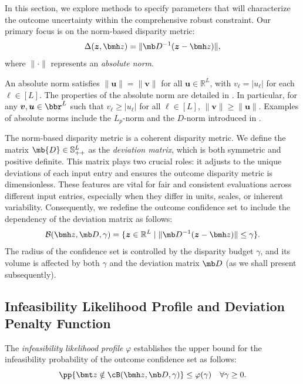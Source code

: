 \documentclass[mnsc, nonblindrev]{informswp}
\newcommand{\1}[1]{\mathds{1}{\left(#1\right)}}
\begin{document}
In this section, we explore methods to specify parameters that will characterize the outcome uncertainty within the comprehensive robust constraint. Our primary focus is on the norm-based disparity metric:
$$
\Delta(\bm z,\bmh z) = \| \mb D^{-1} (\bm z - \bmh z) \|,
$$
where $\|\cdot\|$ represents an {\em absolute norm}. 

\begin{definition}
\textnormal{
An absolute norm satisfies $\|\bm u\| = \| \bm v\|$ for all $\bm u \in \mathbb{R}^L$, with $v_\ell = |u_\ell|$ for each $\ell \in [L]$. The properties of the absolute norm are detailed in \cite{bertsimas2006tractable}. In particular, for any $\bm v, \bm u \in \bbr^L$ such that $v_\ell\geq |u_\ell|$ for all $\ell \in [L]$, $\|\bm v\|\geq \|\bm u\|$. Examples of absolute norms include the $L_p$-norm and the $D$-norm introduced in \cite{bertsimas2004robust}.
}
\end{definition}

The norm-based disparity metric is a coherent disparity metric.
We define the matrix $\mb{D} \in \mathbb{S}^L_{++}$ as the {\em deviation matrix}, which is both symmetric and positive definite. This matrix plays two crucial roles: it adjusts to the unique deviations of each input entry and ensures the outcome disparity metric is dimensionless. These features are vital for fair and consistent evaluations across different input entries, especially when they differ in units, scales, or inherent variability. Consequently, we redefine the outcome confidence set to include the dependency of the deviation matrix as follows:
$$
\mathcal{B}(\bmh z, \mb D, \gamma) = \{ \bm z \in \mathbb{R}^L \;|\; \| \mb D^{-1} (\bm z - \bmh z) \| \leq \gamma \}.
$$
The radius of the confidence set is controlled by the disparity budget $\gamma$, and its volume is affected by both $\gamma$ and the deviation matrix $\mb D$ (as we shall present subsequently).

\subsection{Infeasibility Likelihood Profile and Deviation Penalty Function}

The \textit{infeasibility likelihood  profile} $\varphi$ establishes the upper bound for the infeasibility probability of the outcome confidence set as follows:
$$
\pp{\bmt z \notin \cB(\bmh z,\mb D, \gamma)} \leq \varphi(\gamma) ~~~\forall \gamma \geq 0.
$$
\end{document}
